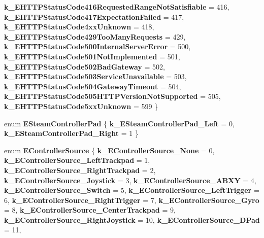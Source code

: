 \begin{DoxyCompactItemize}
{\bfseries k\+\_\+\+E\+H\+T\+T\+P\+Status\+Code416\+Requested\+Range\+Not\+Satisfiable} = 416, 
{\bfseries k\+\_\+\+E\+H\+T\+T\+P\+Status\+Code417\+Expectation\+Failed} = 417, 
{\bfseries k\+\_\+\+E\+H\+T\+T\+P\+Status\+Code4xx\+Unknown} = 418, 
\newline
{\bfseries k\+\_\+\+E\+H\+T\+T\+P\+Status\+Code429\+Too\+Many\+Requests} = 429, 
{\bfseries k\+\_\+\+E\+H\+T\+T\+P\+Status\+Code500\+Internal\+Server\+Error} = 500, 
{\bfseries k\+\_\+\+E\+H\+T\+T\+P\+Status\+Code501\+Not\+Implemented} = 501, 
{\bfseries k\+\_\+\+E\+H\+T\+T\+P\+Status\+Code502\+Bad\+Gateway} = 502, 
\newline
{\bfseries k\+\_\+\+E\+H\+T\+T\+P\+Status\+Code503\+Service\+Unavailable} = 503, 
{\bfseries k\+\_\+\+E\+H\+T\+T\+P\+Status\+Code504\+Gateway\+Timeout} = 504, 
{\bfseries k\+\_\+\+E\+H\+T\+T\+P\+Status\+Code505\+H\+T\+T\+P\+Version\+Not\+Supported} = 505, 
{\bfseries k\+\_\+\+E\+H\+T\+T\+P\+Status\+Code5xx\+Unknown} = 599
 \}
\item 
\mbox{\label{namespace_valve_1_1_steamworks_ae359def099042d0c6052b743569bafbe}} 
enum {\bfseries E\+Steam\+Controller\+Pad} \{ {\bfseries k\+\_\+\+E\+Steam\+Controller\+Pad\+\_\+\+Left} = 0, 
{\bfseries k\+\_\+\+E\+Steam\+Controller\+Pad\+\_\+\+Right} = 1
 \}
\item 
\mbox{\label{namespace_valve_1_1_steamworks_ad5a04b433a6bc8cbbb74d18f15322e50}} 
enum {\bfseries E\+Controller\+Source} \{ \newline
{\bfseries k\+\_\+\+E\+Controller\+Source\+\_\+\+None} = 0, 
{\bfseries k\+\_\+\+E\+Controller\+Source\+\_\+\+Left\+Trackpad} = 1, 
{\bfseries k\+\_\+\+E\+Controller\+Source\+\_\+\+Right\+Trackpad} = 2, 
{\bfseries k\+\_\+\+E\+Controller\+Source\+\_\+\+Joystick} = 3, 
\newline
{\bfseries k\+\_\+\+E\+Controller\+Source\+\_\+\+A\+B\+XY} = 4, 
{\bfseries k\+\_\+\+E\+Controller\+Source\+\_\+\+Switch} = 5, 
{\bfseries k\+\_\+\+E\+Controller\+Source\+\_\+\+Left\+Trigger} = 6, 
{\bfseries k\+\_\+\+E\+Controller\+Source\+\_\+\+Right\+Trigger} = 7, 
\newline
{\bfseries k\+\_\+\+E\+Controller\+Source\+\_\+\+Gyro} = 8, 
{\bfseries k\+\_\+\+E\+Controller\+Source\+\_\+\+Center\+Trackpad} = 9, 
{\bfseries k\+\_\+\+E\+Controller\+Source\+\_\+\+Right\+Joystick} = 10, 
{\bfseries k\+\_\+\+E\+Controller\+Source\+\_\+\+D\+Pad} = 11, 
\newline

\end{DoxyCompactItemize}
